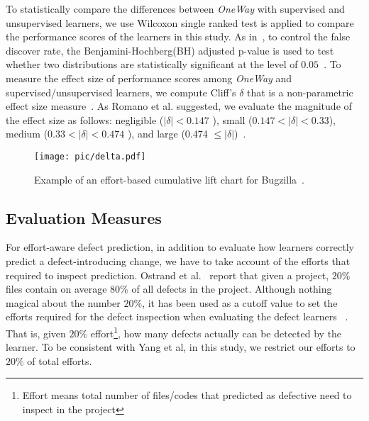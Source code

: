 To statistically compare the differences between {\it OneWay} 
with supervised and unsupervised learners,
we use 
Wilcoxon single ranked test is applied to compare
the performance scores of the learners in this study. As in~\cite{yang2016effort},
to control the false discover rate, the Benjamini-Hochberg(BH) adjusted p-value 
is used to test whether two distributions are statistically significant
at the level of $0.05$~\cite{benjamini1995controlling}. 
To measure the effect size of performance scores among {\it OneWay} and supervised/unsupervised learners,
we compute Cliff's $\delta$ that is a non-parametric effect size measure~\cite{romano2006exploring}.
As Romano et al. suggested, we evaluate the magnitude of the effect size as follows:
negligible ($|\delta|<0.147$ ), small ($ 0.147<|\delta|<0.33$), medium ($0.33<|\delta|<0.474$ ), and large (0.474 $\leq|\delta|$)~\cite{romano2006exploring}.


\begin{figure}[!t]
    \centering
    \texttt{[image: pic/delta.pdf]}
    \caption{Example of an effort-based cumulative lift chart for Bugzilla~\cite{kamei2013large}.}
    \label{fig:delta}
\end{figure}
\subsection{Evaluation Measures}

For effort-aware defect prediction, in addition to evaluate how learners correctly predict a defect-introducing change, we have to take account of the efforts that required to inspect prediction. Ostrand et al.~\cite{ostrand2005predicting}
report that given a project, $20\%$ files contain on average $80\%$  of all defects in the project.
Although nothing magical about the number $20\%$, it has been used as a cutoff
value to set the efforts required for the defect inspection when evaluating the defect learners ~\cite{yang2016effort,kamei2013large,mende2010effort,monden2013assessing}.
That is, given $20\%$ effort\footnote{Effort means total number
of files/codes that predicted as defective need to inspect in the project}, 
how many defects actually can be detected by the learner.
To be consistent with Yang et al, in this study, we restrict our efforts to $20\%$ of total efforts.

